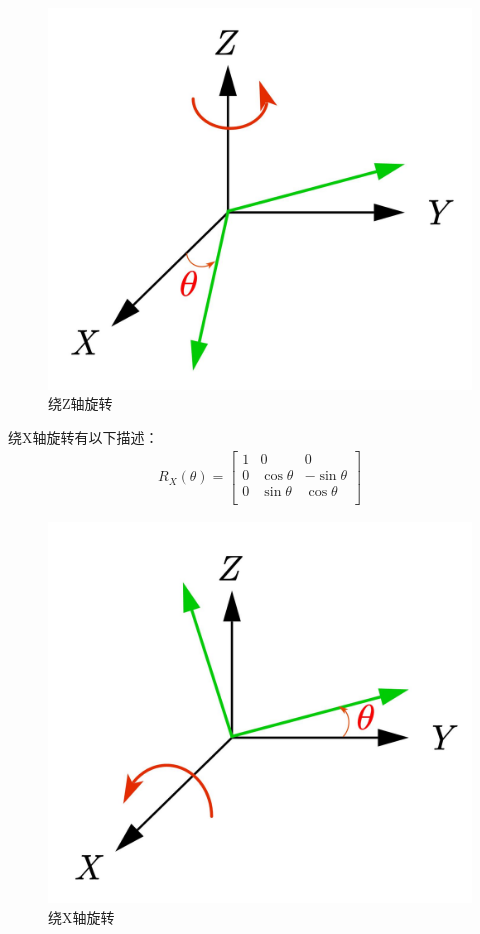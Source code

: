 \documentclass{article}
\begin{document}
\begin{figure}[H]
	\begin{center}
		\includegraphics{旋转矩阵Z}
		\caption{绕Z轴旋转}
		\label{绕Z轴旋转}
	\end{center}
\end{figure}

绕X轴旋转有以下描述：
\begin{gather}
	R_X\left( \theta \right) =\left[ \begin{matrix}
		1&		0&		0\\
		0&		\cos \theta&		-\sin \theta\\
		0&		\sin \theta&		\cos \theta\\
	\end{matrix} \right] 	
\end{gather}

\begin{figure}[H]
	\begin{center}
		\includegraphics{旋转矩阵X}
		\caption{绕X轴旋转}
		\label{绕X轴旋转}
	\end{center}
\end{figure}
\end{document}
